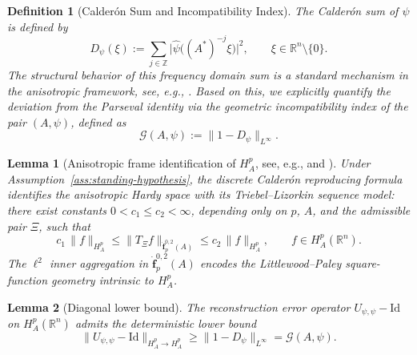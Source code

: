 \documentclass[pdflatex,sn-basic,Numbered]{sn-jnl}
\theoremstyle{thmstyleone}%
\newtheorem{lemma}{Lemma}%
\theoremstyle{thmstylethree}%
\newtheorem{definition}{Definition}%
\begin{document}
\begin{definition}[Calderón Sum and Incompatibility Index]\label{def:calderon-sum}
	The Calder\'on sum of $\psi$ is defined by
	\begin{equation}\label{eq:calderon-sum}
		D_\psi(\xi) := \sum_{j \in \mathbb{Z}}
		\bigl| \hat{\psi}\bigl( (A^{*})^{-j}\xi \bigr) \bigr|^2,
		\qquad \xi \in \mathbb{R}^n \setminus \{0\}.
	\end{equation}
	The structural behavior of this frequency domain sum is a standard mechanism in the anisotropic framework, see, e.g., \cite[Lemma 3.6]{Bownik2007}. Based on this, we explicitly quantify the deviation from the Parseval identity via the geometric incompatibility index of the pair $(A,\psi)$, defined as
	\begin{equation}\label{eq:incompatibility-index}
		\mathcal{G}(A,\psi) := \| 1 - D_\psi \|_{L^\infty} .
	\end{equation}
\end{definition}



\begin{lemma}[{Anisotropic frame identification of $H^p_A$, see, e.g., \cite[Theorem 7.1]{Bownik2007} and \cite[Lemma 6.3, Theorem 6.7]{Bownik2003}}]\label{lem:calderon-formula}
	Under Assumption~\ref{ass:standing-hypothesis}, the discrete Calder\'on reproducing formula identifies the anisotropic Hardy space with its Triebel--Lizorkin sequence model: there exist constants $0 < c_1 \le c_2 < \infty$, depending only on $p$, $A$, and the admissible pair $\Xi$, such that
	\begin{equation}\label{eq:calderon-equivalence}
		c_1\, \| f \|_{H^p_A}  \le  \| T_\Xi f \|_{\dot{\mathbf{f}}^{0,2}_p(A)}  \le  c_2\, \| f \|_{H^p_A},
		\qquad f \in H^p_A(\mathbb{R}^n).
	\end{equation}
	The $\ell^2$ inner aggregation in $\dot{\mathbf{f}}^{0,2}_p(A)$ encodes the Littlewood--Paley square-function geometry intrinsic to $H^p_A$.
\end{lemma}


\begin{lemma}[Diagonal lower bound]\label{lem:diagonal-lower-bound}
	The reconstruction error operator $U_{\psi,\psi} - \mathrm{Id}$ on
	$H^p_A(\mathbb{R}^n)$ admits the deterministic lower bound
	\begin{equation}\label{eq:diagonal-lower-bound}
		\| U_{\psi,\psi} - \mathrm{Id} \|_{H^p_A \to H^p_A}
		 \ge  \| 1 - D_\psi \|_{L^\infty}
		 =  \mathcal{G}(A,\psi) .
	\end{equation}
\end{lemma}
\end{document}
